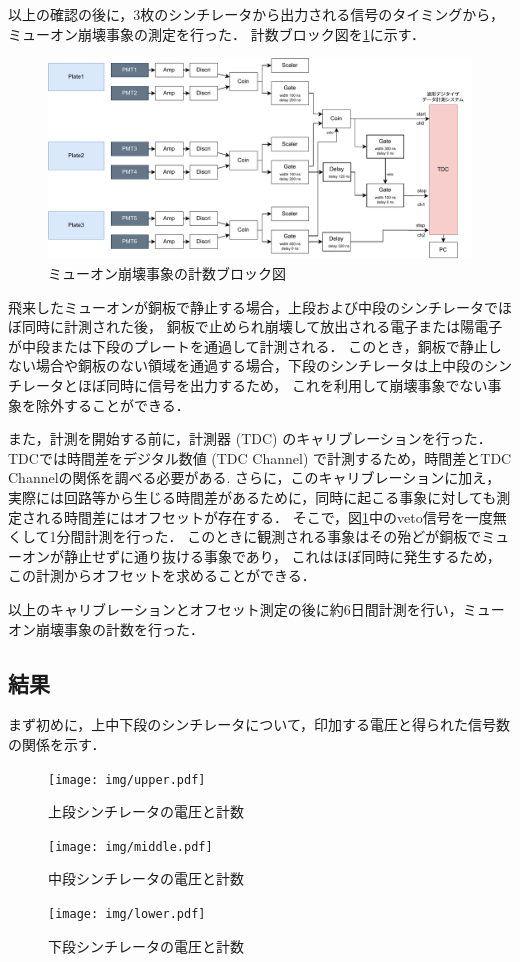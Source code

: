 \documentclass[uplatex,dvipdfmx,a4j,12pt]{jsarticle}
\begin{document}
以上の確認の後に，3枚のシンチレータから出力される信号のタイミングから，ミューオン崩壊事象の測定を行った．
計数ブロック図を\ref{fig:block}に示す．
\begin{figure}[H]
  \centering
  \includegraphics[width=0.9\linewidth]{img/block.pdf}
  \caption{ミューオン崩壊事象の計数ブロック図}
  \label{fig:block}
\end{figure}
飛来したミューオンが銅板で静止する場合，上段および中段のシンチレータでほぼ同時に計測された後，
銅板で止められ崩壊して放出される電子または陽電子が中段または下段のプレートを通過して計測される．
このとき，銅板で静止しない場合や銅板のない領域を通過する場合，下段のシンチレータは上中段のシンチレータとほぼ同時に信号を出力するため，
これを利用して崩壊事象でない事象を除外することができる．

また，計測を開始する前に，計測器 (TDC) のキャリブレーションを行った．
TDCでは時間差をデジタル数値 (TDC Channel) で計測するため，時間差とTDC Channelの関係を調べる必要がある.
さらに，このキャリブレーションに加え，実際には回路等から生じる時間差があるために，同時に起こる事象に対しても測定される時間差にはオフセットが存在する．
そこで，図\ref{fig:block}中のveto信号を一度無くして1分間計測を行った．
このときに観測される事象はその殆どが銅板でミューオンが静止せずに通り抜ける事象であり，
これはほぼ同時に発生するため，この計測からオフセットを求めることができる．

以上のキャリブレーションとオフセット測定の後に約6日間計測を行い，ミューオン崩壊事象の計数を行った．

\subsection{結果}
まず初めに，上中下段のシンチレータについて，印加する電圧と得られた信号数の関係を示す．
\begin{figure}[H]
  \centering
  \begin{minipage}
    {0.3\linewidth}
    \centering
    \texttt{[image: img/upper.pdf]}
    \caption{上段シンチレータの電圧と計数}
    \label{fig:upper}
  \end{minipage}
  \begin{minipage}
    {0.3\linewidth}
    \centering
    \texttt{[image: img/middle.pdf]}
    \caption{中段シンチレータの電圧と計数}
    \label{fig:middle}
  \end{minipage}
  \begin{minipage}
    {0.3\linewidth}
    \centering
    \texttt{[image: img/lower.pdf]}
    \caption{下段シンチレータの電圧と計数}
    \label{fig:lower}
  \end{minipage}
\end{figure}
\end{document}
